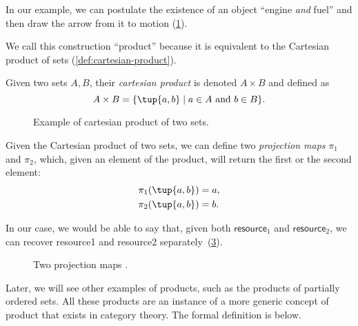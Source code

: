 In our example, we can postulate the existence of an object ``engine \emph{and}
fuel'' and then draw the arrow from it to motion (\cref{fig:e13}).

\begin{figure}[h!]
    \centering
    \caption{\label{fig:e13} 
    }
\end{figure}

We call this construction ``product'' because it is equivalent to
the Cartesian product of sets (\cref{def:cartesian-product}).

\begin{definition}
\label{def:cartesian-product}
   Given two sets $A,B$, their \emph{cartesian product} is denoted $A\times  B$
   and defined as 
   \begin{equation}
       A\times  B=\{ \tup{a,b}\mid a\in A\text{ and } b\in B\}.
   \end{equation}
\end{definition}

\begin{figure}[h!]
    \centering
    \caption{Example of cartesian product of two sets.\label{fig:cartesian-product}}
\end{figure}

Given the Cartesian product of two sets, we can define two \emph{projection maps} $\pi_1$
and $\pi_2$, which, given an element of the product, will return the first or the second
element:
\begin{equation}
\begin{aligned}
    \pi_1(\tup{a,b}) &= a,\\
    \pi_2(\tup{a,b}) &= b.
\end{aligned}
\end{equation}

In our case, we would be able to say that, given both $\mathsf{resource}_1$ and $\mathsf{resource}_2$,
we can recover resource1 and resource2 separately~(\cref{fig:resource-product}).

\begin{figure}[h!]
    \centering
    \caption{Two projection maps \label{fig:resource-product}.}
\end{figure}


Later, we will see other examples of products, such as the products of partially ordered sets.
All these products are an instance of a more generic concept of product that exists in category
theory.  The formal definition is below.
 
